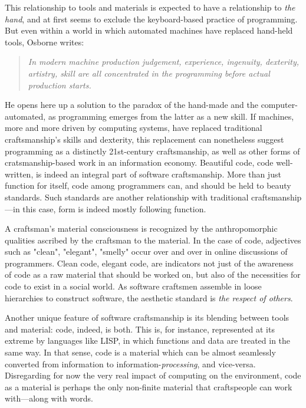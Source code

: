 \documentclass{article}
\begin{document}
This relationship to tools and materials is expected to have a relationship to \emph{the hand}, and at first seems to exclude the keyboard-based practice of programming. But even within a world in which automated machines have replaced hand-held tools, Osborne writes:

\begin{quote}
    \textit{In modern machine production judgement, experience, ingenuity, dexterity, artistry, skill are all concentrated in the programming before actual production starts.\cite{osborne_aesthetic_1977}}
\end{quote}

He opens here up a solution to the paradox of the hand-made and the computer-automated, as programming emerges from the latter as a new skill. If machines, more and more driven by computing systems, have replaced traditional craftsmanship's skills and dexterity, this replacement can nonetheless suggest programming as a distinctly 21st-century craftsmanship, as well as other forms of cratsmanship-based work in an information economy.
Beautiful code, code well-written, is indeed an integral part of software craftsmanship\cite{oram_beautiful_2007}. More than just function for itself, code among programmers can, and should be held to beauty standards\cite{pineiro_aesthetics_2003}. Such standards are another relationship with traditional craftsmanship—in this case, form is indeed mostly following function.

A craftsman's material consciousness is recognized by the anthropomorphic qualities ascribed by the craftsman to the material. In the case of code, adjectives such as "clean", "elegant", "smelly" occur over and over in online discussions of programmers. Clean code, elegant code, are indicators not just of the awareness of code as a raw material that should be worked on, but also of the necessities for code to exist in a social world. As software craftsmen assemble in loose hierarchies to construct software, the aesthetic standard is \emph{the respect of others}\cite{abelson_structure_1979}.

Another unique feature of software craftsmanship is its blending between tools and material: code, indeed, is both. This is, for instance, represented at its extreme by languages like LISP, in which functions and data are treated in the same way\cite{mccarthy_lisp_1965}. In that sense, code is a material which can be almost seamlessly converted from information to information-\emph{processing}, and vice-versa. Disregarding for now the very real impact of computing on the environment, code as a material is perhaps the only non-finite material that craftspeople can work with—along with words.
\end{document}
